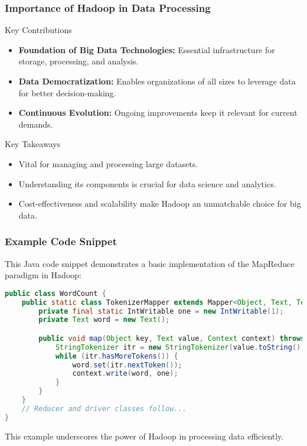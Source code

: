\documentclass[aspectratio=169]{beamer}
\begin{document}
\begin{frame}[fragile]
    \frametitle{Importance of Hadoop in Data Processing}
    \begin{block}{Key Contributions}
        \begin{itemize}
            \item \textbf{Foundation of Big Data Technologies:} Essential infrastructure for storage, processing, and analysis.
            \item \textbf{Data Democratization:} Enables organizations of all sizes to leverage data for better decision-making.
            \item \textbf{Continuous Evolution:} Ongoing improvements keep it relevant for current demands.
        \end{itemize}
    \end{block}
    
    \begin{block}{Key Takeaways}
        \begin{itemize}
            \item Vital for managing and processing large datasets.
            \item Understanding its components is crucial for data science and analytics.
            \item Cost-effectiveness and scalability make Hadoop an unmatchable choice for big data.
        \end{itemize}
    \end{block}
\end{frame}

\begin{frame}[fragile]
    \frametitle{Example Code Snippet}
    This Java code snippet demonstrates a basic implementation of the MapReduce paradigm in Hadoop:

    \begin{lstlisting}[language=Java]
public class WordCount {
    public static class TokenizerMapper extends Mapper<Object, Text, Text, IntWritable> {
        private final static IntWritable one = new IntWritable(1);
        private Text word = new Text();

        public void map(Object key, Text value, Context context) throws IOException, InterruptedException {
            StringTokenizer itr = new StringTokenizer(value.toString());
            while (itr.hasMoreTokens()) {
                word.set(itr.nextToken());
                context.write(word, one);
            }
        }
    }
    // Reducer and driver classes follow...
}
    \end{lstlisting}
    
    This example underscores the power of Hadoop in processing data efficiently.
\end{frame}
\end{document}
